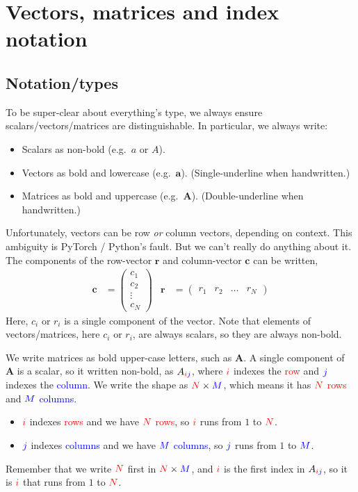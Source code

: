 \documentclass{article}
\renewcommand{\a}{\mathbf{a}}
\newcommand{\A}{\mathbf{A}}
\begin{document}
\section{Vectors, matrices and index notation}

\subsection{Notation/types}

To be super-clear about everything's type, we always ensure scalars/vectors/matrices are distinguishable.  In particular, we always write:
\begin{itemize}
  \item Scalars as non-bold (e.g.\ $a$ or $A$).
  \item Vectors as bold and lowercase (e.g.\ $\a$).  (Single-underline when handwritten.)
  \item Matrices as bold and uppercase (e.g.\ $\A$).  (Double-underline when handwritten.)
\end{itemize}

\renewcommand{\r}{\mathbf{r}}
\renewcommand{\c}{\mathbf{c}}
Unfortunately, vectors can be row \textit{or} column vectors, depending on context.
This ambiguity is PyTorch / Python's fault.  But we can't really do anything about it.
The components of the row-vector $\r$ and column-vector $\c$ can be written,
\begin{align}
  \c &= \begin{pmatrix} c_1 \\ c_2 \\ \vdots \\ c_N \end{pmatrix} &
  \r &= \begin{pmatrix} r_1 & r_2 & \hdots & r_N \end{pmatrix} 
\end{align}
Here, $c_i$ or $r_i$ is a single component of the vector.
Note that elements of vectors/matrices, here $c_i$ or $r_i$, are always scalars, so they are always non-bold.

\newcommand{\N}{\textcolor{red}{N}}
\newcommand{\M}{\textcolor{blue}{M}}
\newcommand{\row}{\textcolor{red}{row}}
\newcommand{\column}{\textcolor{blue}{column}}
\newcommand{\rows}{\textcolor{red}{rows}}
\newcommand{\columns}{\textcolor{blue}{columns}}
\renewcommand{\i}{\textcolor{red}{i}}
\renewcommand{\j}{\textcolor{blue}{j}}
We write matrices as bold upper-case letters, such as $\A$.
A single component of $\A$ is a scalar, so it written non-bold, as $A_{\i\j}$, where $\i$ indexes the \row{} and $\j$ indexes the \column{}.
We write the shape as $\N \times \M$, which means it has $\N$ \rows{} and $\M$ \columns{}.
\begin{itemize}
  \item $\i$ indexes \rows{} and we have $\N$ \rows{}, so $\i$ runs from $1$ to $\N$.
  \item $\j$ indexes \columns{} and we have $\M$ \columns{}, so $\j$ runs from $1$ to $\M$.
\end{itemize}
Remember that we write $\N$ first in $\N \times \M$, and $\i$ is the first index in $A_{\i\j}$, so it is $\i$ that runs from $1$ to $\N$.
\end{document}
